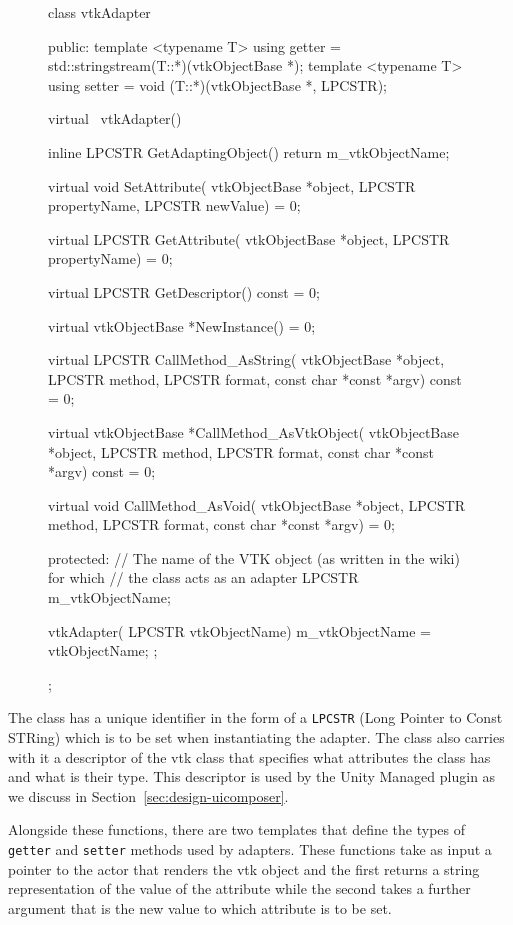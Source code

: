\begin{figure}[ht!]
    \centering
    \begin{cpp}[label=lst:vtkAdapter,caption={vtkAdapter class}]
class vtkAdapter
{
public:
    template <typename T> using getter = std::stringstream(T::*)(vtkObjectBase *);
    template <typename T> using setter = void (T::*)(vtkObjectBase *, LPCSTR);

    virtual ~vtkAdapter() { }

    inline LPCSTR GetAdaptingObject() 
    {
        return m_vtkObjectName;
    }

    virtual void SetAttribute(
        vtkObjectBase *object,
        LPCSTR propertyName,
        LPCSTR newValue) = 0;

    virtual LPCSTR GetAttribute(
        vtkObjectBase *object,
        LPCSTR propertyName) = 0;

    virtual LPCSTR GetDescriptor() const = 0;

    virtual vtkObjectBase *NewInstance() = 0;

    virtual LPCSTR CallMethod_AsString(
        vtkObjectBase *object,
        LPCSTR method,
        LPCSTR format,
        const char *const *argv) const = 0;

    virtual vtkObjectBase *CallMethod_AsVtkObject(
        vtkObjectBase *object,
        LPCSTR method,
        LPCSTR format,
        const char *const *argv) const = 0;

    virtual void CallMethod_AsVoid(
        vtkObjectBase *object,
        LPCSTR method,
        LPCSTR format,
        const char *const *argv) = 0;

protected:
    // The name of the VTK object (as written in the wiki) for which
    // the class acts as an adapter
    LPCSTR m_vtkObjectName;

    vtkAdapter(
        LPCSTR vtkObjectName) 
    { 
        m_vtkObjectName = vtkObjectName;
    };
};
    \end{cpp}
\end{figure}

The class has a unique identifier in the form of a \verb|LPCSTR| (Long Pointer to Const STRing) which is to be set when instantiating the adapter. The class also carries with it a descriptor of the \acrshort{vtk} class that specifies what attributes the class has and what is their type. This descriptor is used by the Unity Managed plugin as we discuss in Section~\ref{sec:design-uicomposer}.

Alongside these functions, there are two templates that define the types of \verb|getter| and \verb|setter| methods used by adapters. These functions take as input a pointer to the actor that renders the \acrshort{vtk} object and the first returns a string representation of the value of the attribute while the second takes a further argument that is the new value to which attribute is to be set.

